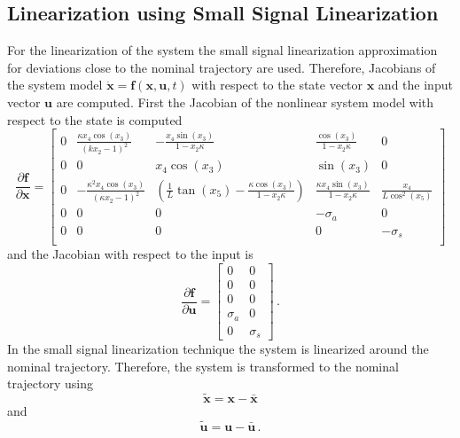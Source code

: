 \documentclass{scrartcl}
\begin{document}
\subsection{Linearization using Small Signal Linearization}
For the linearization of the system the small signal linearization approximation for deviations close to the nominal trajectory are used.
Therefore, Jacobians of the system model $\mathbf{\dot{x}} = \mathbf{f}(\mathbf{x}, \mathbf{u}, t)$ with respect to the state vector $\mathbf{x}$ and the input vector $\mathbf{u}$ are computed.
First the Jacobian of the nonlinear system model with respect to the state is computed
\begin{equation}
	\frac{\partial \mathbf{f}}{\partial \mathbf{x}} = \begin{bmatrix}
		0 & \frac{\kappa x_4 \cos(x_3)}{(kx_2 - 1)^2} & -\frac{x_4 \sin (x_3)}{1 - x_2 \kappa} & \frac{\cos (x_3)}{1 - x_2 \kappa} & 0\\
		0 & 0 & x_4 \cos(x_3) & \sin(x_3) & 0\\
		0 & -\frac{\kappa^2 x_4 \cos(x_3)}{(\kappa x_2 - 1)^2} & \left(\frac{1}{L}\tan(x_5) - \frac{\kappa \cos (x_3)}{1 - x_2 \kappa}\right) & \frac{\kappa x_4 \sin(x_3)}{1 - x_2 \kappa} & \frac{x_4}{L \cos^2(x_5)}\\
		0 & 0 & 0 & -\sigma_a & 0\\
		0 & 0 & 0 & 0& -\sigma_s\\
	\end{bmatrix}
\end{equation}
and the Jacobian with respect to the input is
\begin{equation}
	\frac{\partial \mathbf{f}}{\partial \mathbf{u}} = \begin{bmatrix}
		0 & 0\\
		0 & 0\\
		0 & 0\\
		\sigma_a & 0\\
		0 & \sigma_s
	\end{bmatrix}\, .
\end{equation}
In the small signal linearization technique the system is linearized around the nominal trajectory.
Therefore, the system is transformed to the nominal trajectory using
\begin{equation}
	\boldsymbol{\tilde{x}} = \mathbf{x} - \boldsymbol{\bar{x}}
\end{equation}
and
\begin{equation}
	\boldsymbol{\tilde{u}} = \mathbf{u} - \boldsymbol{\bar{u}} \, .
\end{equation}
\end{document}
